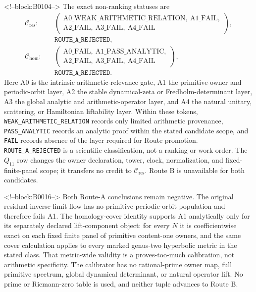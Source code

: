 \documentclass[11pt]{article}
\theoremstyle{definition}
\theoremstyle{remark}
\begin{document}
<!--block:B0104-->
The exact non-ranking statuses are
\[
\begin{aligned}
\mathcal C_{\mathrm{res}}:\quad&
\left(
\begin{gathered}
\mathrm{A0\_WEAK\_ARITHMETIC\_RELATION},\ \mathrm{A1\_FAIL},\\
\mathrm{A2\_FAIL},\ \mathrm{A3\_FAIL},\ \mathrm{A4\_FAIL}
\end{gathered}
\right),\\[-1pt]
&\texttt{ROUTE\_A\_REJECTED},\\[4pt]
\mathcal C_{\mathrm{hom}}:\quad&
\left(
\begin{gathered}
\mathrm{A0\_FAIL},\ \mathrm{A1\_PASS\_ANALYTIC},\\
\mathrm{A2\_FAIL},\ \mathrm{A3\_FAIL},\ \mathrm{A4\_FAIL}
\end{gathered}
\right),\\[-1pt]
&\texttt{ROUTE\_A\_REJECTED}.
\end{aligned}
\]
Here A0 is the intrinsic arithmetic-relevance gate, A1 the primitive-owner and periodic-orbit layer, A2 the stable dynamical-zeta or Fredholm-determinant layer, A3 the global analytic and arithmetic-operator layer, and A4 the natural unitary, scattering, or Hamiltonian liftability layer. Within these tokens, \texttt{WEAK\_ARITHMETIC\_RELATION} records only limited arithmetic provenance, \texttt{PASS\_ANALYTIC} records an analytic proof within the stated candidate scope, and \texttt{FAIL} records absence of the layer required for Route promotion. \texttt{ROUTE\_A\_REJECTED} is a scientific classification, not a ranking or work order. The $Q_{11}$ row changes the owner declaration, tower, clock, normalization, and fixed-finite-panel scope; it transfers no credit to $\mathcal C_{\mathrm{res}}$. Route B is unavailable for both candidates.

<!--block:B0016-->
Both Route-A conclusions remain negative. The original residual inverse-limit flow has no primitive periodic-orbit population and therefore fails A1. The homology-cover identity supports A1 analytically only for its separately declared lift-component object: for every $N$ it is coefficientwise exact on each fixed finite panel of primitive content-one owners, and the same cover calculation applies to every marked genus-two hyperbolic metric in the stated class. That metric-wide validity is a proves-too-much calibration, not arithmetic specificity. The calibrator has no rational-prime owner map, full primitive spectrum, global dynamical determinant, or natural operator lift. No prime or Riemann-zero table is used, and neither tuple advances to Route B.
\end{document}
